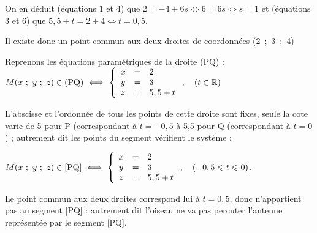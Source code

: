 \documentclass[10pt]{article}
\providecommand{\R}{\mathbb{R}}
\begin{document}
\begin{enumerate}
 On en déduit (équations 1 et 4) que $2 = - 4 + 6s \iff 6 = 6s \iff s = 1$ et (équations 3 et 6) que $5,5 + t = 2 + 4 \iff t = 0,5.$

Il existe donc un point commun aux deux droites de coordonnées (2~;~3~;~4)

Reprenons les équations paramétriques de la droite (PQ) : $M(x~;~y~;~z) \in (\text{PQ}) \iff \left\{\begin{array}{l c l}
x &=& 2\\
y &=&3\\
z &=&5,5 + t
\end{array}\right., \quad (t \in \R)$

L'abscisse et l'ordonnée de tous les points de cette droite sont fixes, seule la cote varie de 5 pour P (correspondant à $t = -0,5$ à 5,5 pour Q (correspondant à $t = 0$) ; autrement dit les points du segment vérifient le système :

$M(x~;~y~;~z) \in [\text{PQ}] \iff \left\{\begin{array}{l c l}
x &=& 2\\
y &=&3\\
z &=&5,5 + t
\end{array}\right., \quad (-0,5 \leqslant t \leqslant 0)$.

Le point commun aux deux droites correspond lui à $t = 0,5$, donc n'appartient pas au segment [PQ] : autrement dit l'oiseau ne va pas percuter l'antenne représentée par le segment [PQ].

\end{enumerate}

\bigskip
\end{document}
